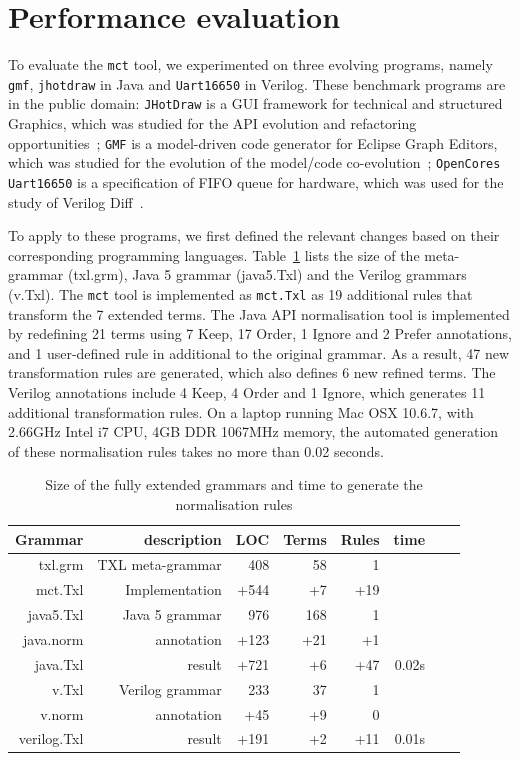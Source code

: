 \documentclass[10pt, conference, compsocconf]{IEEEtran}
\begin{document}
{\section{Performance evaluation}\label{sec:experiment}
To evaluate the {\tt mct} tool, we experimented on three evolving programs, namely {\tt gmf}, {\tt jhotdraw} in Java and {\tt Uart16650} in Verilog. These benchmark programs are in the public domain: {\tt JHotDraw} is a  GUI framework for technical and structured Graphics, which was studied for the API evolution and refactoring opportunities~\cite{DBLP:journals/smr/DigJ06}; {\tt GMF} is a model-driven code generator for Eclipse Graph Editors, which was  studied for the evolution of the model/code co-evolution~\cite{DBLP:conf/sle/HerrmannsdoerferRW09}; {\tt OpenCores Uart16650} is a specification of FIFO queue for hardware, which was used for the study of Verilog Diff~\cite{Duley:2010:PDA:1858996.1859093}.

To apply to these programs, we first defined the relevant changes based on their corresponding programming languages. Table~\ref{table:2} lists the size of the meta-grammar (txl.grm), Java 5 grammar (java5.Txl) and the Verilog grammars (v.Txl). The {\tt mct} tool is implemented as {\tt mct.Txl} as 19 additional rules that transform the 7 extended terms. The Java API normalisation tool is implemented by redefining 21 terms using 7 Keep, 17 Order, 1 Ignore and 2 Prefer annotations, and 1 user-defined rule in additional to the original grammar. As a result, 47 new transformation rules are generated, which also defines 6 new refined terms. The Verilog annotations include 4 Keep, 4 Order and 1 Ignore, which generates 11 additional transformation rules. On a laptop running Mac OSX 10.6.7, with 2.66GHz Intel i7 CPU, 4GB DDR 1067MHz memory, the automated generation of these normalisation rules takes no more than 0.02 seconds.
\begin{table}\centering
\caption{Size of the fully extended grammars and time to generate the normalisation rules\label{table:2}}
\begin{tabular}{| r || r | r | r | r |  r |  r |  r  |}\hline
{\bf Grammar} & description & LOC & Terms &  Rules & time \\  \hline\hline
txl.grm & TXL meta-grammar & 408 & 58 & 1  &\\
mct.Txl & Implementation & +544 & +7 & +19 &\\ \hline
java5.Txl & Java 5 grammar &  976 & 168 & 1 &\\
java.norm & annotation & +123 & +21 & +1 &\\ 
java.Txl & result & +721  & +6 & +47  & 0.02s\\\hline  
v.Txl & Verilog grammar & 233 &  37 &  1 &\\
v.norm & annotation & +45 & +9 & 0 &\\
verilog.Txl & result & +191 &  +2 & +11 & 0.01s\\\hline
\hline\end{tabular}
\end{table}

}
\end{document}
